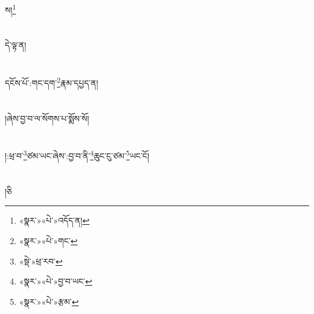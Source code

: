 ས།\footnote{«སྣར་»«པེ་»འདོད་ན།}\chapter{ }དེ་ལྟ་ན།\chapter{ }དངོས་པོ་:གང་དག་\footnote{«སྣར་»«པེ་»གང་}རྣམ་དཔྱད་ན།\chapter{ }།ཞེས་བྱ་བ་ལ་སོགས་པ་སྨོས་སོ།\chapter{ }།:ཕྲ་བ་\footnote{«སྡེ་»ཕྲ་རབ་}ཙམ་ཡང་ཞེས་:བྱ་བ་ནི་\footnote{«སྣར་»«པེ་»བྱ་བ་ཡང་}ཆུང་ངུ་ཙམ་\footnote{«སྣར་»«པེ་»རྩམ་}ཡང་ངོ།\chapter{ }།ཅི